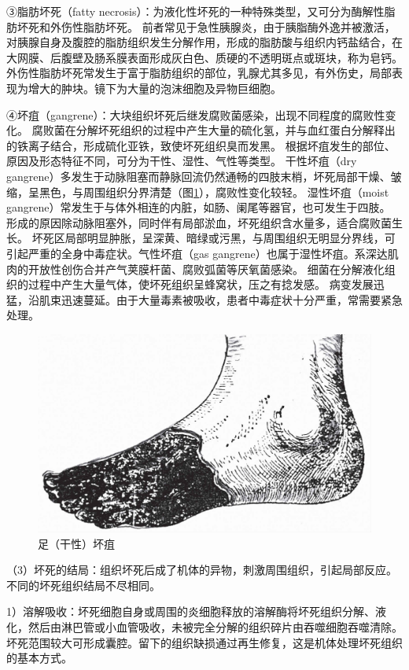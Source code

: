 ③脂肪坏死（fatty
necrosis）：为液化性坏死的一种特殊类型，又可分为酶解性脂肪坏死和外伤性脂肪坏死。
前者常见于急性胰腺炎，由于胰脂酶外逸并被激活，对胰腺自身及腹腔的脂肪组织发生分解作用，形成的脂肪酸与组织内钙盐结合，在大网膜、后腹壁及肠系膜表面形成灰白色、质硬的不透明斑点或斑块，称为皂钙。
外伤性脂肪坏死常发生于富于脂肪组织的部位，乳腺尤其多见，有外伤史，局部表现为增大的肿块。镜下为大量的泡沫细胞及异物巨细胞。

④坏疽（gangrene）：大块组织坏死后继发腐败菌感染，出现不同程度的腐败性变化。
腐败菌在分解坏死组织的过程中产生大量的硫化氢，并与血红蛋白分解释出的铁离子结合，形成硫化亚铁，致使坏死组织臭而发黑。
根据坏疽发生的部位、原因及形态特征不同，可分为干性、湿性、气性等类型。
干性坏疽（dry
gangrene）多发生于动脉阻塞而静脉回流仍然通畅的四肢末梢，坏死局部干燥、皱缩，呈黑色，与周围组织分界清楚（图\ref{fig1-17}），腐败性变化较轻。
湿性坏疽（moist
gangrene）常发生于与体外相连的内脏，如肠、阑尾等器官，也可发生于四肢。
形成的原因除动脉阻塞外，同时伴有局部淤血，坏死组织含水量多，适合腐败菌生长。
坏死区局部明显肿胀，呈深黄、暗绿或污黑，与周围组织无明显分界线，可引起严重的全身中毒症状。气性坏疽（gas
gangrene）也属于湿性坏疽。系深达肌肉的开放性创伤合并产气荚膜杆菌、腐败弧菌等厌氧菌感染。
细菌在分解液化组织的过程中产生大量气体，使坏死组织呈蜂窝状，压之有捻发感。
病变发展迅猛，沿肌束迅速蔓延。由于大量毒素被吸收，患者中毒症状十分严重，常需要紧急处理。

\begin{figure}[!htbp]
	\centering
	\includegraphics{./images/Image00018.jpg}
	\caption{足（干性）坏疽}
	\label{fig1-17}
\end{figure}

（3）坏死的结局：组织坏死后成了机体的异物，刺激周围组织，引起局部反应。不同的坏死组织结局不尽相同。

1）溶解吸收：坏死细胞自身或周围的炎细胞释放的溶解酶将坏死组织分解、液化，然后由淋巴管或小血管吸收，未被完全分解的组织碎片由吞噬细胞吞噬清除。坏死范围较大可形成囊腔。留下的组织缺损通过再生修复，这是机体处理坏死组织的基本方式。

